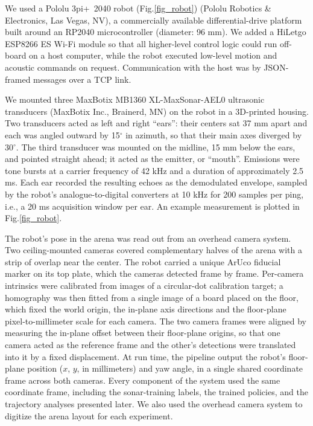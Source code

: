 \documentclass[11pt]{article}
\begin{document}
We used a Pololu 3pi+~2040 robot (Fig.\ref{fig_robot}) (Pololu Robotics \& Electronics, Las Vegas, NV), a commercially available differential-drive platform built around an RP2040 microcontroller (diameter: 96 mm). We added a HiLetgo ESP8266 ES Wi-Fi module so that all higher-level control logic could run off-board on a host computer, while the robot executed low-level motion and acoustic commands on request. Communication with the host was by JSON-framed messages over a TCP link.


We mounted three MaxBotix MB1360 XL-MaxSonar-AEL0 ultrasonic transducers (MaxBotix Inc., Brainerd, MN) on the robot in a 3D-printed housing. Two transducers acted as left and right ``ears'': their centers sat 37 mm apart and each was angled outward by 15$^{\circ}$ in azimuth, so that their main axes diverged by 30$^{\circ}$. The third transducer was mounted on the midline, 15 mm below the ears, and pointed straight ahead; it acted as the emitter, or ``mouth''. Emissions were tone bursts at a carrier frequency of 42 kHz and a duration of approximately 2.5 ms. Each ear recorded the resulting echoes as the demodulated envelope, sampled by the robot's analogue-to-digital converters at 10 kHz for 200 samples per ping, i.e., a 20 ms acquisition window per ear. An example measurement is plotted in Fig.\ref{fig_robot}.


The robot's pose in the arena was read out from an overhead camera system. Two ceiling-mounted cameras covered complementary halves of the arena with a strip of overlap near the center. The robot carried a unique ArUco fiducial marker on its top plate, which the cameras detected frame by frame. Per-camera intrinsics were calibrated from images of a circular-dot calibration target; a homography was then fitted from a single image of a board placed on the floor, which fixed the world origin, the in-plane axis directions and the floor-plane pixel-to-millimeter scale for each camera. The two camera frames were aligned by measuring the in-plane offset between their floor-plane origins, so that one camera acted as the reference frame and the other's detections were translated into it by a fixed displacement. At run time, the pipeline output the robot's floor-plane position ($x$, $y$, in millimeters) and yaw angle, in a single shared coordinate frame across both cameras. Every component of the system used the same coordinate frame, including the sonar-training labels, the trained policies, and the trajectory analyses presented later. We also used the overhead camera system to digitize the arena layout for each experiment. 
\end{document}
